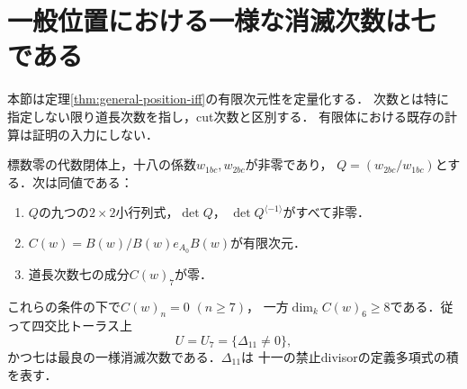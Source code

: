 \section{一般位置における一様な消滅次数は七である}
\label{sec:uniform-c7}
本節は定理\ref{thm:general-position-iff}の有限次元性を定量化する．
次数とは特に指定しない限り道長次数を指し，cut次数と区別する．
有限体における既存の計算は証明の入力にしない．

\begin{theorem}[最良の一様消滅次数]\label{thm:uniform-c7}
標数零の代数閉体上，十八の係数$w_{1bc},w_{2bc}$が非零であり，
$Q=(w_{2bc}/w_{1bc})$とする．次は同値である：
\begin{enumerate}
\item $Q$の九つの$2\times2$小行列式，$\det Q$，
$\det Q^{\langle-1\rangle}$がすべて非零．
\item $C(w)=B(w)/B(w)e_{A_0}B(w)$が有限次元．
\item 道長次数七の成分$C(w)_7$が零．
\end{enumerate}
これらの条件の下で$C(w)_n=0$ $(n\ge7)$，
一方$\dim_kC(w)_6\ge8$である．従って四交比トーラス上
\[
 U=U_7=\{\Delta_{11}\ne0\},
\]
かつ七は最良の一様消滅次数である．$\Delta_{11}$は
十一の禁止divisorの定義多項式の積を表す．
\end{theorem}
